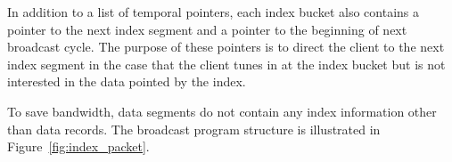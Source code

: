 In addition to a list of temporal pointers, each index bucket also
contains a pointer to the next index segment and a pointer to the
beginning of next broadcast cycle. The purpose of these pointers
is to direct the client to the next index segment in the case that
the client tunes in at the index bucket but is not interested in
the data pointed by the index.

To save bandwidth, data segments do not contain any index
information other than data records. The broadcast program
structure is illustrated in Figure~\ref{fig:index_packet}.







